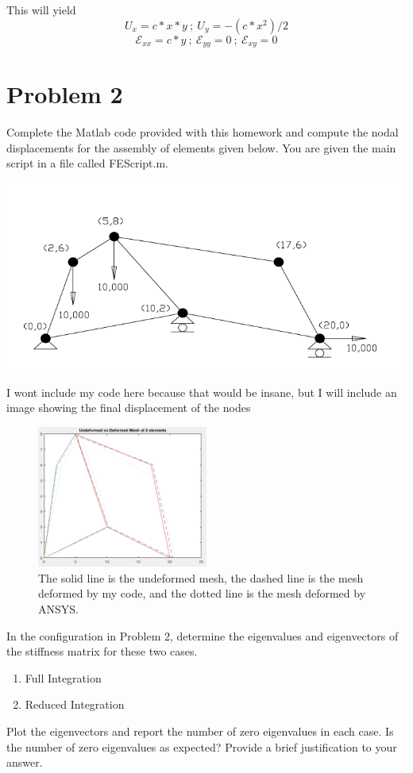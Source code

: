 \documentclass[11pt]{amsart}
\begin{document}
This will yield 
$$U_x = c*x*y \ ;  \ U_y  = -(c*x^2)/2 $$
$$ \mathcal{E}_{xx} = c*y \  ; \  \mathcal{E}_{yy} = 0 \ ; \ \mathcal{E}_{xy} = 0$$

\section{Problem 2}
Complete the Matlab code provided with this homework and compute the
nodal displacements for the assembly of elements given below. You are given the main
script in a file called FEScript.m.

\includegraphics[scale=0.5]{P2_formulation.png}

I wont include my code here because that would be insane, but I will include an image showing the final displacement of the nodes

\begin{figure}
  \caption{The solid line is the undeformed mesh, the dashed line is the mesh deformed by my code, and the dotted line is the mesh deformed by ANSYS. }
  \centering
    \includegraphics[width=0.5\textwidth]{P2.png}
\end{figure}
In the configuration in Problem 2, determine the eigenvalues and
eigenvectors of the stiffness matrix for these two cases.
\begin{enumerate}
	\item Full Integration
	\item Reduced Integration
\end{enumerate}
Plot the eigenvectors and report the number of zero eigenvalues in each case. Is the
number of zero eigenvalues as expected? Provide a brief justification to your answer.
\pagebreak[4] 
\end{document}
